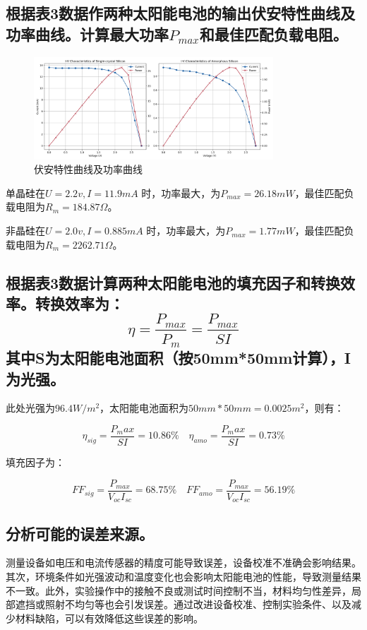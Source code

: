 \documentclass{ctexart}
\begin{document}
\subsection{根据表3数据作两种太阳能电池的输出伏安特性曲线及功率曲线。计算最大功率$P_{max}$和最佳匹配负载电阻。}

\begin{figure}[!htbp]
    \centering
    \includegraphics[width=0.8\textwidth]{3.png}
    \caption{伏安特性曲线及功率曲线}
    \label{fig:output_characteristics_and_power_curve_of_monocrystalline_silicon}
\end{figure}

单晶硅在$ U = 2.2 v , I = 11.9 mA $ 时，功率最大，为$ P_{max} = 26.18 mW $，最佳匹配负载电阻为$ R_{m} = 184.87 \Omega $。

非晶硅在$ U = 2.0 v , I = 0.885 mA $ 时，功率最大，为$ P_{max} = 1.77 mW $，最佳匹配负载电阻为$ R_{m} = 2262.71 \Omega $。

\subsection{根据表3数据计算两种太阳能电池的填充因子和转换效率。转换效率为：$$ \eta = \frac{P_{max}}{P_{m}} = \frac{P_{max}}{SI} $$其中S为太阳能电池面积（按50mm*50mm计算），I为光强。}

此处光强为$ 96.4 W/m^2 $，太阳能电池面积为$ 50 mm * 50 mm = 0.0025 m^2 $，则有：

$$ \eta_{sig} = \frac{P_max}{SI} = 10.86\% \quad \eta_{amo} = \frac{P_max}{SI} = 0.73\% $$

填充因子为：

$$ FF_{sig} = \frac{P_{max}}{V_{oc}I_{sc}} = 68.75\% \quad FF_{amo} = \frac{P_{max}}{V_{oc}I_{sc}} = 56.19\% $$

\subsection{分析可能的误差来源。}

测量设备如电压和电流传感器的精度可能导致误差，设备校准不准确会影响结果。其次，环境条件如光强波动和温度变化也会影响太阳能电池的性能，导致测量结果不一致。此外，实验操作中的接触不良或测试时间控制不当，材料均匀性差异，局部遮挡或照射不均匀等也会引发误差。通过改进设备校准、控制实验条件、以及减少材料缺陷，可以有效降低这些误差的影响。
\end{document}
